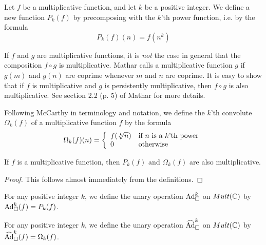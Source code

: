 



\begin{definition}
Let $f$ be a multiplicative function, and let $k$ be a positive integer. We define a new function $P_k(f)$ by precomposing with the $k$'th power function, i.e. by the formula
$$ P_k(f)(n) = f(n^k)   $$
\end{definition}

\begin{remark}
If $f$ and $g$ are multiplicative functions, it is \emph{not} the case in general that the composition $f \circ g$ is multiplicative. Mathar calls a multiplicative function $g$  if $g(m)$ and $g(n)$ are coprime whenever $m$ and $n$ are coprime. It is easy to show that if $f$ is multiplicative and $g$ is persistently multiplicative, then $f \circ g$ is also multiplicative. See section 2.2 (p. 5) of Mathar for more details.
\end{remark}

\begin{definition}
Following McCarthy \cite{} in terminology and notation, we define the $k$'th convolute $\Omega_k(f) $ of a multiplicative function $f$ by the formula 
$$ \Omega_k(f)(n) = \left\{ \begin{array}{ll}  f(\sqrt[k]{n})  & \mbox{if } n \textrm{ is a $k$'th power}  \\ 0 & \mbox{} \textrm{otherwise} \end{array} \right.$$
\end{definition}

\begin{proposition}
If $f$ is a multiplicative function, then $P_k(f)$ and $\Omega_k(f)$ are also multiplicative.
\end{proposition}

\begin{proof}
This follows almost immediately from the definitions.
\end{proof}

\begin{definition}
For any positive integer $k$, we define the unary operation $\text{Ad}^{k}_{\square}$ on $Mult(\mathbb{C})$ by $\text{Ad}^{k}_{\square}(f) = P_k(f)$.
\end{definition}

\begin{definition}
For any positive integer $k$, we define the unary operation $\widehat{\text{Ad}}^{k}_{\square}$ on $Mult(\mathbb{C})$ by $\widehat{\text{Ad}}^{k}_{\square}(f) = \Omega_k(f)$.
\end{definition}


